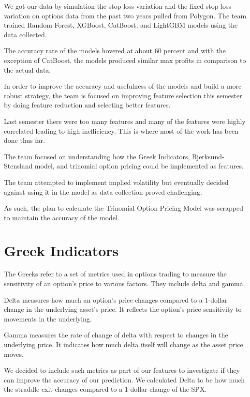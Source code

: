 \documentclass[11pt]{article}
\begin{document}
We got our data by simulation the stop-loss variation and the fixed stop-loss variation on options data from the past two years pulled from Polygon. The team trained Random Forest, XGBoost, CatBoost, and LightGBM models using the data collected. 

The accuracy rate of the models hovered at about 60 percent and with the exception of CatBoost, the models produced similar max profits in comparison to the actual data. 

In order to improve the accuracy and usefulness of the models and build a more robust strategy, the team is focused on improving feature selection this semester by doing feature reduction and selecting  better features. 

Last semester there were too many features and many of the features were highly correlated leading to high inefficiency. This is where most of the work has been done thus far. 

The team focused on understanding how the Greek Indicators, Bjerksund-Stensland model, and trinomial option pricing could be implemented as features. 

The team attempted to implement implied volatility but eventually decided against using it in the model as data collection proved challenging. 

As such, the plan to calculate the Trinomial Option Pricing Model was scrapped to maintain the accuracy of the model.

\section{Greek Indicators}
 The Greeks refer to a set of metrics used in options trading to measure the sensitivity of an option's price to various factors. They include delta and gamma. 

Delta measures how much an option's price changes compared to a 1-dollar change in the underlying asset's price. It reflects the option's price sensitivity to movements in the underlying.

Gamma measures the rate of change of delta with respect to changes in the underlying price. It indicates how much delta itself will change as the asset price moves.

We decided to include such metrics as part of our features to investigate if they can improve the accuracy of our prediction. We calculated Delta to be how much the straddle exit changes compared to a 1-dollar change of the SPX. 
\end{document}
